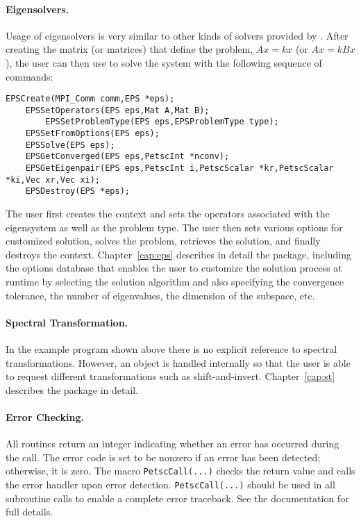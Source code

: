 \paragraph{Eigensolvers.}

Usage of eigensolvers is very similar to other kinds of solvers provided by \petsc. After creating the matrix (or matrices) that define the problem, $Ax = kx$ (or $Ax=kBx$), the user can then use  to solve the system with the following sequence of commands:
  
  
 
	\begin{Verbatim}[fontsize=\small,numbers=none]
	EPSCreate(MPI_Comm comm,EPS *eps);
	EPSSetOperators(EPS eps,Mat A,Mat B);
        EPSSetProblemType(EPS eps,EPSProblemType type);
	EPSSetFromOptions(EPS eps);
	EPSSolve(EPS eps);
	EPSGetConverged(EPS eps,PetscInt *nconv);
	EPSGetEigenpair(EPS eps,PetscInt i,PetscScalar *kr,PetscScalar *ki,Vec xr,Vec xi);
	EPSDestroy(EPS *eps);
	\end{Verbatim}
The user first creates the  context and sets the operators associated with the eigensystem as well as the problem type. The user then sets various options for customized solution, solves the problem, retrieves the solution, and finally destroys the  context. Chapter~\ref{cap:eps} describes in detail the  package, including
the options database that enables the user to customize the solution process at runtime by selecting the solution algorithm and also specifying the convergence tolerance, the number of eigenvalues, the dimension of the subspace, etc.

\paragraph{Spectral Transformation.}

In the example program shown above there is no explicit reference to spectral transformations. However, an  object is handled internally so that the user is able to request different transformations such as shift-and-invert. Chapter~\ref{cap:st} describes the  package in detail.

\paragraph{Error Checking.}

	All \slepc routines return an integer indicating whether an error has occurred during the call. The error code is set to be nonzero if an error has been detected; otherwise, it is zero. The \petsc macro \Verb!PetscCall(...)! checks the return value and calls the \petsc error handler upon error detection. \Verb!PetscCall(...)! should be used in all subroutine calls to enable a complete error traceback. See the \petsc documentation for full details.

